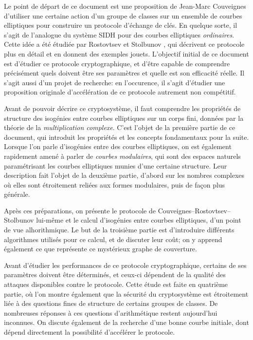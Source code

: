 \documentclass[11pt,a4paper]{article}
\renewcommand{\v}{\vspace{5mm}}
\theoremstyle{definition}
\begin{document}
Le point de départ de ce document est une proposition de Jean-Marc Couveignes \cite{Couv} d'utiliser une certaine action d'un groupe de classes sur un ensemble de courbes elliptiques pour construire un protocole d'échange de clés. En quelque sorte, il s'agit de l'analogue du système SIDH pour des courbes elliptiques \emph{ordinaires}. Cette idée a été étudiée par Rostovtsev et Stolbunov \cite{RoSt}, qui décrivent ce protocole plus en détail et en donnent des exemples jouets. L'objectif initial de ce document est d'étudier ce protocole cryptographique, et d'être capable de comprendre précisément quels doivent être ses paramètres et quelle est son efficacité réelle. Il s'agit aussi d'un projet de recherche: en l'occurence, il s'agit d'étudier une proposition originale d'accélération de ce protocole autrement non compétitif.

\v

Avant de pouvoir décrire ce cryptosystème, il faut comprendre les propriétés de structure des isogénies entre courbes elliptiques sur un corps fini, données par la théorie de la \emph{multiplication complexe}. C'est l'objet de la première partie de ce document, qui introduit les propriétés et les concepts fondamentaux pour la suite. Lorsque l'on parle d'isogénies entre des courbes elliptiques, on est également rapidement amené à parler de \emph{courbes modulaires}, qui sont des espaces naturels paramétrisant les courbes elliptiques munies d'une certaine structure. Leur description fait l'objet de la deuxième partie, d'abord sur les nombres complexes où elles sont étroitement reliées aux formes modulaires, puis de façon plus générale.

Après ces préparations, on présente le protocole de Couveignes--Rostovtsev--Stolbunov lui-même et le calcul d'isogénies entre courbes elliptiques, d'un point de vue alhorithmique. Le but de la troisième partie est d'introduire différents algorithmes utilisés pour ce calcul, et de discuter leur coût; on y apprend également ce que représente ce mystérieux graphe de couverture.

Avant d'étudier les performances de ce protocole cryptographique, certains de ses paramètres doivent être déterminés, et ceux-ci dépendent de la qualité des attaques disponibles contre le protocole. Cette étude est faite en quatrième partie, où l'on montre également que la sécurité du cryptosystème est étroitement liée à des questions fines de structure de certains groupes de classes. De nombreuses réponses à ces questions d'arithmétique restent aujourd'hui inconnues. On discute également de la recherche d'une bonne courbe initiale, dont dépend directement la possibilité d'accélérer le protocole.
\end{document}
